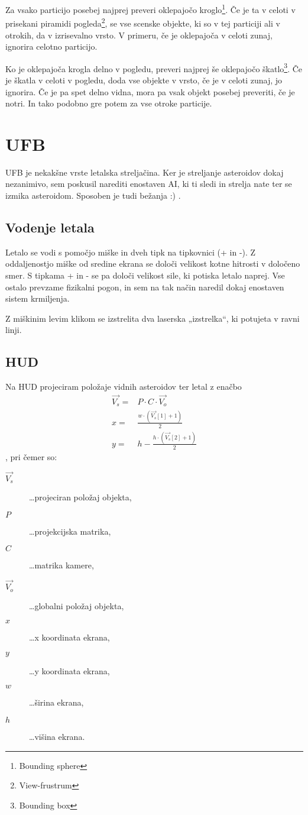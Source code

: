 \documentclass[a4paper]{article}
\begin{document}
Za vsako particijo posebej najprej preveri oklepajočo kroglo\footnote{Bounding sphere}. Če je ta v celoti v prisekani piramidi pogleda\footnote{View-frustrum}, se vse scenske objekte, ki so v tej particiji ali v otrokih, da v izrisevalno vrsto. V primeru, če je oklepajoča v celoti zunaj, ignorira celotno particijo.

Ko je oklepajoča krogla delno v pogledu, preveri najprej še oklepajočo škatlo\footnote{Bounding box}. Če je škatla v celoti v pogledu, doda vse objekte v vrsto, če je v celoti zunaj, jo ignorira. Če je pa spet delno vidna, mora pa vsak objekt posebej preveriti, če je notri. In tako podobno gre potem za vse otroke particije.

\section{UFB}
UFB je nekakšne vrste letalska streljačina. Ker je streljanje asteroidov dokaj nezanimivo, sem poskusil narediti enostaven AI, ki ti sledi in strelja nate ter se izmika asteroidom. Sposoben je tudi bežanja :) .

\subsection{Vodenje letala}
Letalo se vodi s pomočjo miške in dveh tipk na tipkovnici (+ in -). Z oddaljenostjo miške od sredine ekrana se določi velikost kotne hitrosti v določeno smer. S tipkama + in - se pa določi velikost sile, ki potiska letalo naprej. Vse ostalo prevzame fizikalni pogon, in sem na tak način naredil dokaj enostaven sistem krmiljenja.

Z miškinim levim klikom se izstrelita dva laserska „izstrelka“, ki potujeta v ravni linji.

\subsection{HUD}
Na HUD projeciram položaje vidnih asteroidov ter letal z enačbo
\begin{eqnarray*}
\overrightarrow{V_s} =& P \cdot C \cdot \overrightarrow{V_o}\\
x =& \frac{w \cdot (\overrightarrow{V_s}[1] + 1)}{2} \\
y =& h - \frac{h \cdot (\overrightarrow{V_s}[2] + 1)}{2}
\end{eqnarray*},
pri čemer so:
\begin{description}
  \item[$\overrightarrow{V_s}$] \dots projeciran položaj objekta,
  \item[$P$] \dots projekcijska matrika,
  \item[$C$] \dots matrika kamere,
  \item[$\overrightarrow{V_o}$] \dots globalni položaj objekta,
  \item[$x$] \dots x koordinata ekrana,
  \item[$y$] \dots y koordinata ekrana,
  \item[$w$] \dots širina ekrana,
  \item[$h$] \dots višina ekrana.
\end{description}
\end{document}
